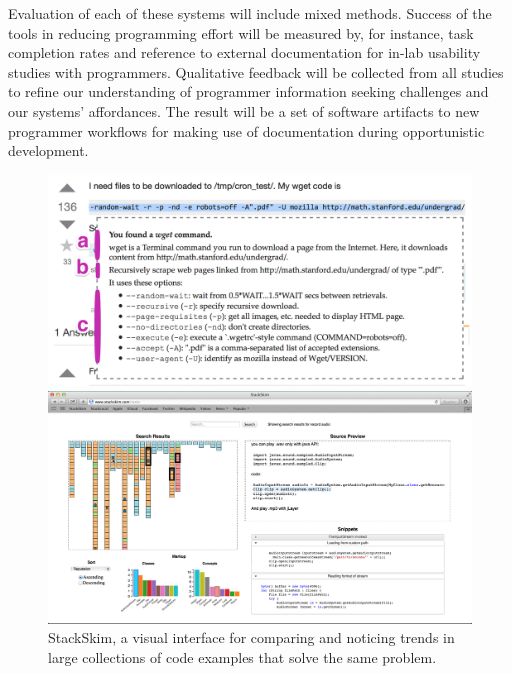 \documentclass[12pt]{memoir}
\begin{document}
Evaluation of each of these systems will include mixed methods.
Success of the tools in reducing programming effort will be measured by, for instance, task completion rates and reference to external documentation for in-lab usability studies with programmers.
Qualitative feedback will be collected from all studies to refine our understanding of programmer information seeking challenges and our systems' affordances.
The result will be a set of software artifacts to new programmer workflows for making use of documentation during opportunistic development.

\fi

\begin{figure}%
  \centering
  \parbox{.45\textwidth}{%
    \includegraphics[width=\linewidth]{figures/tutorons_microexplanation}
    \caption{%
      A micro-explanation for a command line generated by a Tutoron with multiple levels of detail 
      (definition, high-level intent, arguments)
    }\label{fig:tutorons_microexplanation}
  }%
  \qquad
  \parbox{.45\textwidth}{%
    \includegraphics[width=\linewidth]{figures/stackskim_ui}
    \caption{%
      StackSkim, a visual interface for comparing and noticing trends in large collections of code examples that solve the same problem.
    }\label{fig:stackskim_ui}
  }
\end{figure}
\fi
\end{document}
